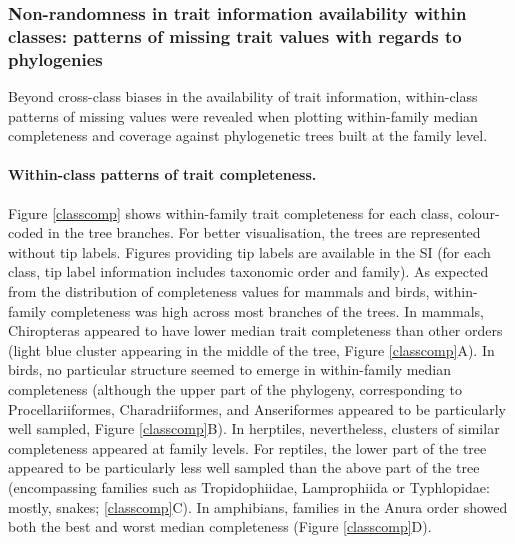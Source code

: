 \subsubsection{Non-randomness in trait information availability within classes: patterns of missing trait values with regards to phylogenies}
Beyond cross-class biases in the availability of trait information, within-class patterns of missing values were revealed when plotting within-family median completeness and coverage against phylogenetic trees built at the family level.

\paragraph{Within-class patterns of trait completeness.}
Figure \ref{classcomp} shows within-family trait completeness for each class, colour-coded in the tree branches. For better visualisation, the trees are represented without tip labels. Figures providing tip labels are available in the SI (for each class, tip label information includes taxonomic order and family). As expected from the distribution of completeness values for mammals and birds, within-family completeness was high across most branches of the trees. In mammals, Chiropteras appeared to have lower median trait completeness than other orders (light blue cluster appearing in the middle of the tree, Figure \ref{classcomp}A). In birds, no particular structure seemed to emerge in within-family median completeness (although the upper part of the phylogeny, corresponding to Procellariiformes, Charadriiformes, and Anseriformes appeared to be particularly well sampled, Figure \ref{classcomp}B). In herptiles, nevertheless, clusters of similar completeness appeared at family levels. For reptiles, the lower part of the tree appeared to be particularly less well sampled than the above part of the tree (encompassing families such as Tropidophiidae, Lamprophiida or Typhlopidae: mostly, snakes; \ref{classcomp}C). In amphibians, families in the Anura order showed both the best and worst median completeness (Figure \ref{classcomp}D). 

